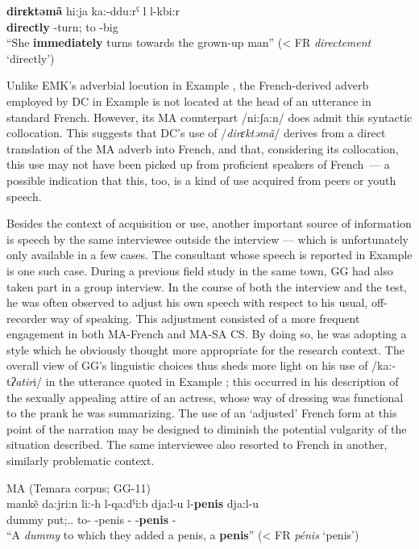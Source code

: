 \documentclass[output=paper]{langscibook}
\begin{document}
\begin{exe}
	\ex\label{falchetta:ex:15} 
	\gll \textbf{dirɛktǝmã}   hi:ja   ka:-ddu:rˁ   l   l-kbi:r \\
	\textbf{directly} \Third\F\SG{} \PRVB-turn;\Third\F\SG{} to \DEF-big \\
	\glt “She \textbf{immediately} turns towards the grown-up man” (< FR \textit{directement} ‘directly’)
\end{exe}


\largerpage
Unlike EMK’s adverbial locution in Example , the French-derived adverb employed by DC in Example  is not located at the head of an utterance in standard French. However, its \gls*{MA} counterpart /ni:ʃa:n/ does admit this syntactic collocation. This suggests that DC’s use of /\textit{dirɛktǝmã}/ derives from a direct translation of the \gls*{MA} adverb into French, and that, considering its collocation, this use may not have been picked up from proficient speakers of French~— a possible indication that this, too, is a kind of use acquired from peers or youth speech. 

Besides the context of acquisition or use, another important source of information is speech by the same interviewee outside the interview — which is unfortunately only available in a few cases. The consultant whose speech is reported in Example  is one such case. During a previous field study in the same town, GG had also taken part in a group interview. In the course of both the interview and the test, he was often observed to adjust his own speech with respect to his usual, off-recorder way of speaking. This adjustment consisted of a more frequent engagement in both \gls*{MA}-French and \gls*{MA}-\gls*{SA} \gls*{CS}. By doing so, he was adopting a style which he obviously thought more appropriate for the research context. The overall view of GG’s linguistic choices thus sheds more light on his use of /ka:-t\textit{ʔatir}i/ in the utterance quoted in Example ; this occurred in his description of the sexually appealing attire of an actress, whose way of dressing was functional to the prank he was summarizing. The use of an ‘adjusted' French form at this point of the narration may be designed to diminish the potential vulgarity of the situation described. The same interviewee also resorted to French in another, similarly problematic context.

\begin{exe}
	\ex\label{falchetta:ex:16} \gls*{MA} (Temara corpus; GG-11) \\
	\gll mankẽ da:jri:n li:-h l-qa:dˁi:b dja:l-u   l-\textbf{penis}  dja:l-u\\
	dummy put;\PTCP.\ACT.\PL{} to-\Third\M\SG{} \DEF-penis \GEN-\Third\M\SG{} \DEF-\textbf{penis} \GEN-\Third\M\SG{} \\
	\glt “A \textit{dummy} to which they added a penis, a \textbf{penis}” (< FR \textit{pénis} ‘penis’)
\end{exe}
\end{document}
